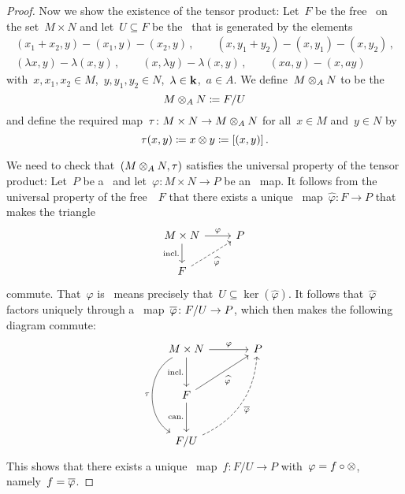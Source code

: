\begin{proof}
  Now we show the existence of the tensor product:
  Let~$F$ be the free~{\module{$\kf$}} on the set~$M \times N$ and let~$U \subseteq F$ be the~{\submodule{$\kf$}} that is generated by the elements
  \begin{gather*}
    (x_1 + x_2, y) - (x_1, y) - (x_2, y) \,,
    \qquad
    (x, y_1 + y_2) - (x, y_1) - (x, y_2) \,,
    \\
    (\lambda x, y) - \lambda (x,y) \,,
    \qquad
    (x, \lambda y) - \lambda (x,y) \,,
    \qquad
    (xa, y) - (x, ay)
  \end{gather*}
  with~$x, x_1, x_2 \in M$,~$y, y_1, y_2 \in N$,~$\lambda \in \mathbf{k}$,~$a \in A$.
  We define~$M \otimes_A N$ to be the~{\module{$\kf$}}
  \[
              M \otimes_A N
    \coloneqq  F/U
  \]
  and define the required map~$\tau \colon M \times N \to M \otimes_A N$ for all~$x \in M$ and~$y \in N$ by
  \[
              \tau(x,y)
    \coloneqq  x \otimes y 
    \coloneqq  [(x,y)] \,.
  \]
  
  We need to check that~$(M \otimes_A N, \tau)$ satisfies the universal property of the tensor product:
  Let~$P$ be a~{\module{$\kf$}} and let~$\varphi \colon M \times N \to P$ be an~{} map.
  It follows from the universal property of the free~{\module{$\kf$}}~$F$ that there exists a unique~{\klin} map~$\widehat{\varphi} \colon F \to P$ that makes the triangle
  \[
    \begin{tikzcd}
        M \times N
        \arrow{r}[above]{\varphi}
        \arrow{d}[left]{\text{incl.}}
      & P
      \\
        F
        \arrow[dashed]{ur}[below right]{\widehat{\varphi}}
      & {}
    \end{tikzcd}
  \]
  commute.
  That~$\varphi$ is~{} means precisely that~$U \subseteq \ker(\widehat{\varphi})$.
  It follows that~$\widehat{\varphi}$ factors uniquely through a~{\klin} map~$\overline{\varphi} \colon F/U \to P$, which then makes the following diagram commute:
  \[
    \begin{tikzcd}[sep = large]
        M \times N
        \arrow{r}[above]{\varphi}
        \arrow{d}[left]{\text{incl.}}
        \arrow[bend right = 60]{dd}[left]{\tau}
      & P
      \\
        F
        \arrow{ur}[below right]{\widehat{\varphi}}
        \arrow{d}[left]{\text{can.}}
      & {}
      \\
        F/U
        \arrow[dashed, bend right]{uur}[below right]{\induced{\varphi}}
      & {}
    \end{tikzcd}
  \]
  This shows that there exists a unique~{\klin} map~$f \colon F/U \to P$ with~$\varphi = f \circ \otimes$, namely~$f = \overline{\varphi}$.
\end{proof}



